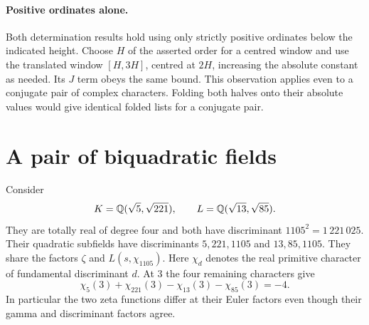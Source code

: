 \documentclass[11pt]{article}
\begin{document}
\paragraph{Positive ordinates alone.}
Both determination results hold using only strictly positive ordinates
below the indicated height. Choose $H$ of the asserted order for a centred
window and use the translated window $[H,3H]$, centred at $2H$, increasing
the absolute constant as needed. Its $J$ term obeys the same bound.
This observation applies even to a conjugate pair of complex characters.
Folding both halves onto their absolute values would give identical folded
lists for a conjugate pair.

\section{A pair of biquadratic fields}
Consider
\[
 K=\mathbb Q(\sqrt5,\sqrt{221}),\qquad L=\mathbb Q(\sqrt{13},\sqrt{85}).
\]
They are totally real of degree four and both have discriminant
$1105^2=1\,221\,025$. Their quadratic subfields have discriminants
$5,221,1105$ and $13,85,1105$. They share the factors $\zeta$ and
$L(s,\chi_{1105})$. Here $\chi_d$ denotes the real primitive character
of fundamental discriminant $d$. At $3$ the four remaining characters give
\[
 \chi_5(3)+\chi_{221}(3)-\chi_{13}(3)-\chi_{85}(3)=-4 .
\]
In particular the two zeta functions differ at their Euler factors even
though their gamma and discriminant factors agree.
\end{document}
